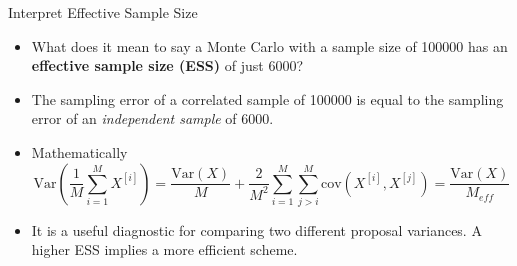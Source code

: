 \documentclass[10pt]{beamer}
\begin{document}
\begin{frame}{Interpret Effective Sample Size}
\begin{itemize}
\item What does it mean to say a Monte Carlo with a sample size of 100000 has an {\bf effective sample size (ESS)} of just 6000?

\item The sampling error of a correlated sample of 100000 is equal to the sampling error of an {\em independent sample} of 6000.

\item Mathematically
\begin{equation*}
\mbox{Var}\left(\frac{1}{M}\sum_{i=1}^M X^{[i]}\right)=\frac{\mbox{Var}(X)}{M}
+\frac{2}{M^2}\sum_{i=1}^M\sum_{j>i}^M\mbox{cov}(X^{[i]},X^{[j]})=\frac{\mbox{Var}(X)}{M_{eff}}
\end{equation*}

\item It is a useful diagnostic for comparing two different proposal variances.  A higher ESS implies a more efficient scheme.
\end{itemize}
\end{frame}
\end{document}
